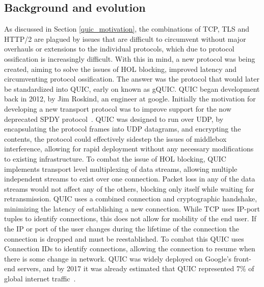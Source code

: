 \documentclass[english, 12pt, a4paper, elec, utf8, a-2b, online]{aaltothesis}
\begin{document}
\subsection{Background and evolution}
As discussed in Section \ref{quic_motivation}, the combinations of TCP, TLS and HTTP/2 are
plagued by issues that are difficult to circumvent without major overhauls or extensions to
the individual protocols, which due to protocol ossification is increasingly difficult. With
this in mind, a new protocol was being created, aiming to solve the issues of
HOL blocking, improved latency and circumventing protocol ossification. The answer
was the protocol that would later be standardized into QUIC, early on known as gQUIC.
QUIC began development back in 2012, by Jim Roskind, an engineer at google. Initially
the motivation for developing a new transport protocol was to improve support for
the now deprecated SPDY protocol~\cite{googleQUICDesign}. QUIC was designed to run over
UDP, by encapsulating the protocol frames into UDP datagrams, and encrypting the contents,
the protocol could effectively sidestep the issues of middlebox interference, allowing
for rapid deployment without any necessary modifications to existing infrastructure.
To combat the issue of HOL blocking, QUIC implements transport level multiplexing of
data streams, allowing multiple independent streams to exist over one connection.
Packet loss in any of the data streams would not affect any of the others, blocking
only itself while waiting for retransmission. QUIC uses a combined connection and
cryptographic handshake, minimizing the latency of establishing a new connection.
While TCP uses IP-port tuples to identify connections, this does not allow for mobility
of the end user. If the IP or port of the user changes during the lifetime of the connection
the connection is dropped and must be reestablished. To combat this QUIC uses
Connection IDs to identify connections, allowing the connection to resume when
there is some change in network. QUIC was widely deployed on Google's front-end servers,
and by 2017 it was already estimated that QUIC represented 7\% of global internet
traffic~\cite{quic_transport_protocol_design}.
\end{document}
